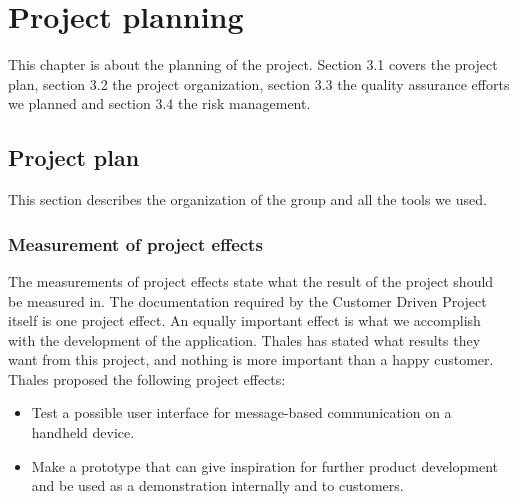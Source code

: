 \chapter{Project planning}

This chapter is about the planning of the project. Section 3.1 covers the project plan, section 3.2 the project organization, section 3.3 the quality assurance efforts we planned and section 3.4 the risk management. 

\section{Project plan}
This section describes the organization of the group and all the tools we used.

\subsection{Measurement of project effects}
The measurements of project effects state what the result of the project should be measured in. The documentation required by the Customer Driven Project itself is one project effect. An equally important effect is what we accomplish with the development of the application. Thales has stated what results they want from this project, and nothing is more important than a happy customer.
\newline
\newline
Thales proposed the following project effects:
\begin{itemize}
\item{}Test a possible user interface for message-based communication on a handheld device.
\item{}Make a prototype that can give inspiration for further product development and be used as a demonstration internally and to customers.
\end{itemize}
